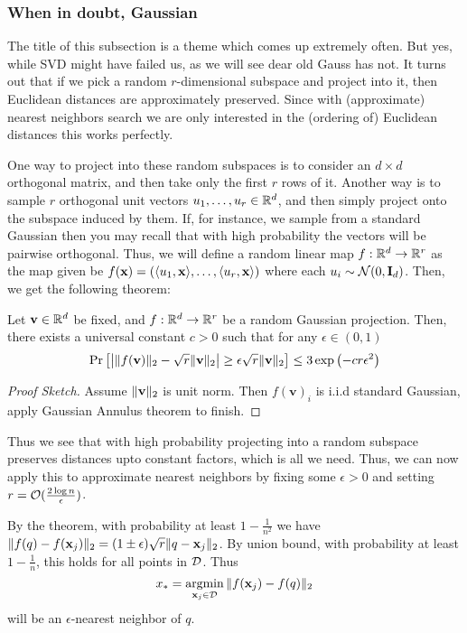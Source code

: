         \subsubsection{When in doubt, Gaussian}
            The title of this subsection is a theme which comes up extremely often. But yes,
            while SVD might have failed us, as we will see dear old Gauss has not. It turns out
            that if we pick a random $r$-dimensional subspace and project into it, then Euclidean
            distances are approximately preserved. Since with (approximate) nearest neighbors search
            we are only interested in the (ordering of) Euclidean distances this works perfectly.

            One way to project into these random subspaces is to consider an $d \times d$ orthogonal
            matrix, and then take only the first $r$ rows of it. Another way is to sample $r$ orthogonal
            unit vectors $u_1, \dots, u_r \in \mathbb{R}^d$, and then simply project onto the subspace induced
            by them. If, for instance, we sample from a standard Gaussian then you may recall that with
            high probability the vectors will be pairwise orthogonal.  Thus, we will define
            a random linear map $f: \mathbb{R}^d \to \mathbb{R}^r$ as the map given be $f(\mathbf{x}) = \left( \langle u_1, \mathbf{x} \rangle, \dots, \langle u_r, \mathbf{x} \rangle \right)$
            where each $u_i \sim \mathcal{N}(0, \mathbf{I}_d)$. Then, we get the following theorem:
            
            \begin{theorem}
            Let $\mathbf{v} \in \mathbb{R}^d$ be fixed, and $f: \mathbb{R}^d \to \mathbb{R}^r$ be a random Gaussian projection. Then, there
            exists a universal constant $c > 0$ such that for any $\epsilon \in (0,1)$
            \begin{align*}
                \Pr \left[ \left| \lVert f(\mathbf{v}) \rVert_2 - \sqrt{r}\lVert \mathbf{v} \rVert_2 \right| \geq \epsilon \sqrt{r} \lVert \mathbf{v} \rVert_2 \right] \leq 3 \exp\left( -cr\epsilon^2 \right)
            \end{align*}
            \end{theorem}
            \begin{proof}[Proof Sketch]
                Assume $\lVert \mathbf{v} \rVert_2$ is unit norm. Then $f(\mathbf{v})_i$ is i.i.d standard Gaussian, apply
                Gaussian Annulus theorem to finish.
            \end{proof}

            Thus we see that with high probability projecting into a
            random subspace preserves distances upto constant factors,
            which is all we need. Thus, we can now apply this to
            approximate nearest neighbors by fixing some $\epsilon > 0$
            and setting $r = \mathcal{O}(\frac{2\log{n}}{\epsilon})$.

            By the theorem, with probability at least $1 - \frac{1}{n^2}$
            we have $\lVert f(q) - f(\mathbf{x}_j) \rVert_2 = (1 \pm \epsilon)\sqrt{r} \lVert q - \mathbf{x}_j \rVert_2$.
            By union bound, with probability at least $1 - \frac{1}{n}$, this holds
            for all points in $\mathcal{D}$. Thus $$x_* = \operatorname*{argmin}_{\mathbf{x}_j \in \mathcal{D}} \, \lVert f(\mathbf{x}_j) - f(q) \rVert_2$$
            will be an $\epsilon$-nearest neighbor of $q$.